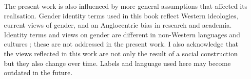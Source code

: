 The present work is also influenced by more general assumptions that affected its realisation. Gender identity terms used in this book reflect Western ideologies, current views of gender, and an Anglocentric bias in research and academia. Identity terms and views on gender are different in non-Western languages and cultures \citep{lester2018trans}; these are not addressed in the present work. I also acknowledge that the views reflected in this work are not only the result of a social construction but they also change over time. Labels and language used here may become outdated in the future.



